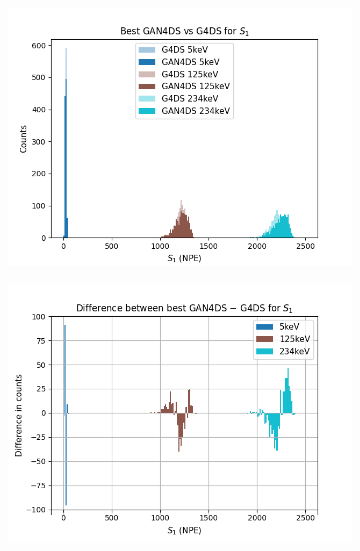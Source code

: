 \documentclass[11pt]{article} %
\begin{document}
\begin{figure}[H]
\centering
\begin{minipage}{\textwidth}
  \begin{subfigure}{.5\textwidth}
      \includegraphics[scale=0.6]{./images/best_s1.png}
  \end{subfigure}
  \begin{subfigure}{.5\textwidth}
      \includegraphics[scale=0.6]{./images/difference_best_s1.png}
  \end{subfigure}
\end{minipage}
\begin{minipage}{\textwidth}

\end{minipage}
\end{figure}
\end{document}
